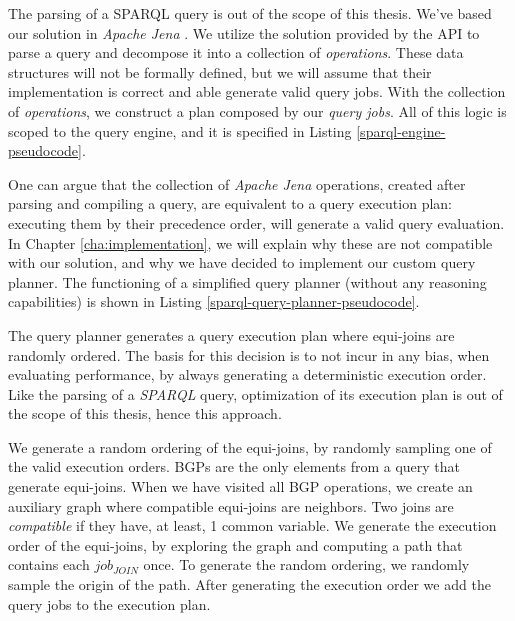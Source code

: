 The parsing of a \gls{SPARQL} query is out of the scope of this thesis. We've based our solution in \emph{Apache Jena} \autocite{The_Apache_Software_Foundation_undated-wk}. We utilize the solution provided by the API to parse a query and decompose it into a collection of \emph{operations}. These data structures will not be formally defined, but we will assume that their implementation is correct and able generate valid query jobs. With the collection of \emph{operations}, we construct a plan composed by our \emph{query jobs}. All of this logic is scoped to the query engine, and it is specified in Listing \ref{sparql-engine-pseudocode}.

%

One can argue that the collection of \emph{Apache Jena} operations, created after parsing and compiling a query, are equivalent to a query execution plan: executing them by their precedence order, will generate a valid query evaluation. In Chapter \ref{cha:implementation}, we will explain why these are not compatible with our solution, and why we have decided to implement our custom query planner. The functioning of a simplified query planner (without any reasoning capabilities) is shown in Listing \ref{sparql-query-planner-pseudocode}.

%

The query planner generates a query execution plan where equi-joins are randomly ordered. The basis for this decision is to not incur in any bias, when evaluating performance, by always generating a deterministic execution order. Like the parsing of a \emph{SPARQL} query, optimization of its execution plan is out of the scope of this thesis, hence this approach.

We generate a random ordering of the equi-joins, by randomly sampling one of the valid execution orders. \gls{BGP}s are the only elements from a query that generate equi-joins. When we have visited all \gls{BGP} operations, we create an auxiliary graph where compatible equi-joins are neighbors. Two joins are \emph{compatible} if they have, at least, 1 common variable. We generate the execution order of the equi-joins, by exploring the graph and computing a path that contains each $job_{JOIN}$ once. To generate the random ordering, we randomly sample the origin of the path. After generating the execution order we add the query jobs to the execution plan.

